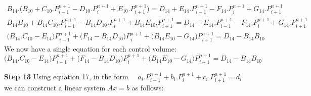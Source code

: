 \documentclass[11pt,letterpaper,titlepage]{article}
\begin{document}
\begin{equation*}
\begin{aligned}
B_{14}.\biggr( B_{10} + C_{10}. P_{i-1}^{n+1} - D_{10}. P_{i}^{n+1}+ E_{10}. P_{i+1}^{n+1} \biggr)=D_{14} +E_{14}.P_{i-1}^{n+1} - F_{14}.P_{i}^{n+1} + G_{14}.P_{i+1}^{n+1} \\
B_{14} B_{10} + B_{14}C_{10}. P_{i-1}^{n+1}-B_{14}D_{10}. P_{i}^{n+1}+B_{14} E_{10}. P_{i+1}^{n+1}=D_{14} +E_{14}.P_{i-1}^{n+1} - F_{14}.P_{i}^{n+1} + G_{14}.P_{i+1}^{n+1} \\
\biggr( B_{14}.C_{10}-E_{14} \biggr)P_{i-1}^{n+1}   + \biggr(F_{14} - B_{14}D_{10} \biggr)P_{i}^{n+1}+ \biggr(B_{14}E_{10}-G_{14} \biggr)P_{i+1}^{n+1} = D_{14}-B_{14}B_{10}
\end{aligned}
\end{equation*}
\newline
We now have a single equation for each control volume:
\begin{equation}
\biggr( B_{14}.C_{10}-E_{14} \biggr)P_{i-1}^{n+1}   + \biggr(F_{14} - B_{14}D_{10} \biggr)P_{i}^{n+1}+ \biggr(B_{14}E_{10}-G_{14} \biggr)P_{i+1}^{n+1} = D_{14}-B_{14}B_{10}
\end{equation}









\vspace{0.5cm}\noindent
\textbf{Step 13}\newline
Using equation 17, in the form $\quad a_i.P_{i-1}^{n+1} + b_i.P_{i}^{n+1} + c_i.P_{i+1}^{n+1} = d_i \quad $ we can construct a linear system $Ax=b$ as follows:
\end{document}
